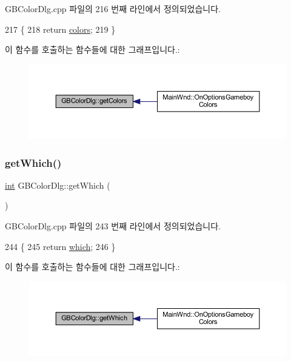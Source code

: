 G\+B\+Color\+Dlg.\+cpp 파일의 216 번째 라인에서 정의되었습니다.


\begin{DoxyCode}
217 \{
218   \textcolor{keywordflow}{return} \mbox{\hyperlink{class_g_b_color_dlg_a24de2e906e28d7b4a006d68d6c8afeee}{colors}};
219 \}
\end{DoxyCode}
이 함수를 호출하는 함수들에 대한 그래프입니다.\+:
\nopagebreak
\begin{figure}[H]
\begin{center}
\leavevmode
\includegraphics[width=350pt]{class_g_b_color_dlg_ab3fe3dff45003cb0483ad90eb42a3052_icgraph}
\end{center}
\end{figure}
\mbox{\label{class_g_b_color_dlg_a8f4e8dbf15d1f2d1bab9df384ebf484e}} 
\subsubsection{\texorpdfstring{get\+Which()}{getWhich()}}
{\footnotesize\ttfamily \mbox{\hyperlink{_util_8cpp_a0ef32aa8672df19503a49fab2d0c8071}{int}} G\+B\+Color\+Dlg\+::get\+Which (\begin{DoxyParamCaption}{ }\end{DoxyParamCaption})}



G\+B\+Color\+Dlg.\+cpp 파일의 243 번째 라인에서 정의되었습니다.


\begin{DoxyCode}
244 \{
245   \textcolor{keywordflow}{return} \mbox{\hyperlink{class_g_b_color_dlg_a8f7bbf1c4a4ffe4a6c57454b9087ff28}{which}};
246 \}
\end{DoxyCode}
이 함수를 호출하는 함수들에 대한 그래프입니다.\+:
\nopagebreak
\begin{figure}[H]
\begin{center}
\leavevmode
\includegraphics[width=350pt]{class_g_b_color_dlg_a8f4e8dbf15d1f2d1bab9df384ebf484e_icgraph}
\end{center}
\end{figure}
\mbox{\label{class_g_b_color_dlg_ab17b13356eebe33676cd07b8b6c75d8c}} 
